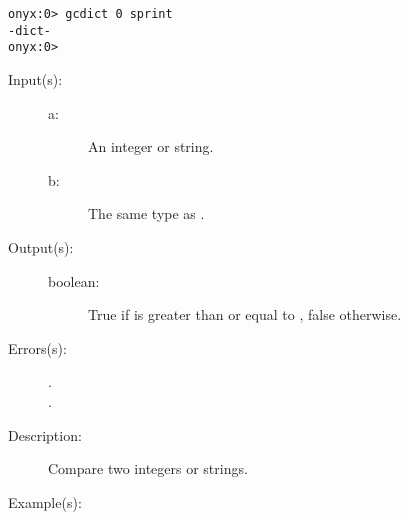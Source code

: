 \begin{description}
\begin{description}
\begin{verbatim}
onyx:0> gcdict 0 sprint
-dict-
onyx:0>
		\end{verbatim}
	\end{description}
\label{systemdict:ge}
\item[{\onyxop{a b}{ge}{boolean}}: ]
	\begin{description}\item[]
	\item[Input(s): ]
		\begin{description}\item[]
		\item[a: ]
			An integer or string.
		\item[b: ]
			The same type as .
		\end{description}
	\item[Output(s): ]
		\begin{description}\item[]
		\item[boolean: ]
			True if  is greater than or equal to ,
			false otherwise.
		\end{description}
	\item[Errors(s): ]
		\begin{description}\item[]
		\item[.]
		\item[.]
		\end{description}
	\item[Description: ]
		Compare two integers or strings.
	\item[Example(s): ]\begin{verbatim}


\end{verbatim}
\end{description}
\end{description}
